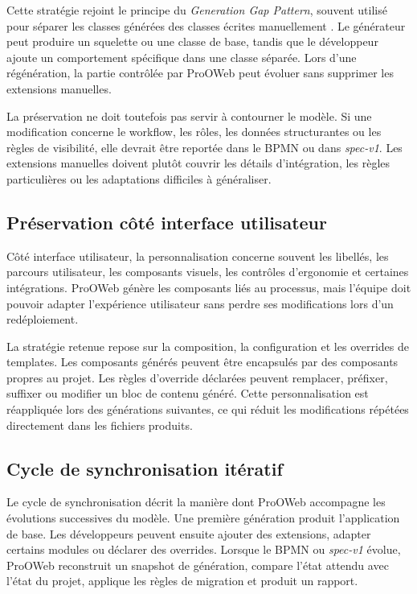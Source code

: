 Cette stratégie rejoint le principe du \textit{Generation Gap Pattern}, souvent utilisé pour séparer les classes générées des classes écrites manuellement \cite{greifenberg2015}. Le générateur peut produire un squelette ou une classe de base, tandis que le développeur ajoute un comportement spécifique dans une classe séparée. Lors d'une régénération, la partie contrôlée par ProOWeb peut évoluer sans supprimer les extensions manuelles.

La préservation ne doit toutefois pas servir à contourner le modèle. Si une modification concerne le workflow, les rôles, les données structurantes ou les règles de visibilité, elle devrait être reportée dans le BPMN ou dans \textit{spec-v1}. Les extensions manuelles doivent plutôt couvrir les détails d'intégration, les règles particulières ou les adaptations difficiles à généraliser.

\subsection{Préservation côté interface utilisateur}

Côté interface utilisateur, la personnalisation concerne souvent les libellés, les parcours utilisateur, les composants visuels, les contrôles d'ergonomie et certaines intégrations. ProOWeb génère les composants liés au processus, mais l'équipe doit pouvoir adapter l'expérience utilisateur sans perdre ses modifications lors d'un redéploiement.

La stratégie retenue repose sur la composition, la configuration et les overrides de templates. Les composants générés peuvent être encapsulés par des composants propres au projet. Les règles d'override déclarées peuvent remplacer, préfixer, suffixer ou modifier un bloc de contenu généré. Cette personnalisation est réappliquée lors des générations suivantes, ce qui réduit les modifications répétées directement dans les fichiers produits.

\subsection{Cycle de synchronisation itératif}

Le cycle de synchronisation décrit la manière dont ProOWeb accompagne les évolutions successives du modèle. Une première génération produit l'application de base. Les développeurs peuvent ensuite ajouter des extensions, adapter certains modules ou déclarer des overrides. Lorsque le BPMN ou \textit{spec-v1} évolue, ProOWeb reconstruit un snapshot de génération, compare l'état attendu avec l'état du projet, applique les règles de migration et produit un rapport.

